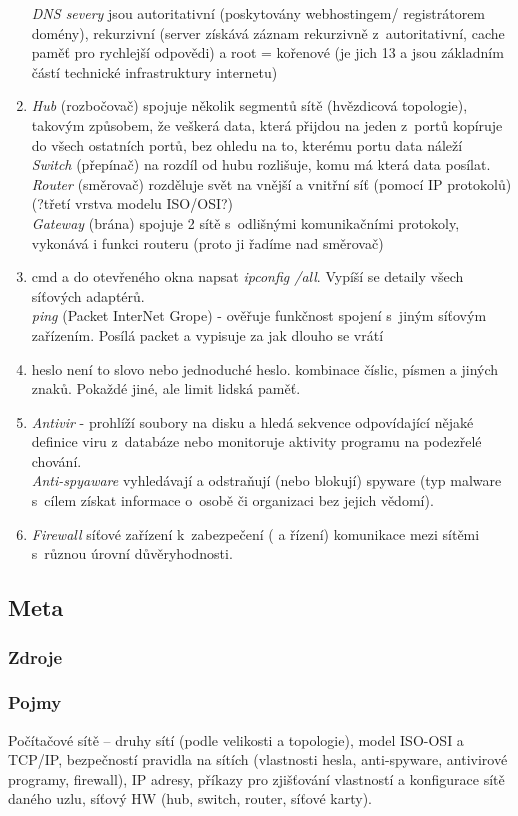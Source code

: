 \documentclass[12pt]{article}
\begin{document}
\begin{enumerate}
\emph{DNS severy} jsou autoritativní (poskytovány webhostingem/ registrátorem domény), rekurzivní (server získává záznam rekurzivně z~autoritativní, cache paměť pro rychlejší odpovědi) a root = kořenové (je jich 13 a jsou základním částí technické infrastruktury internetu)
\item \emph{Hub} (rozbočovač) spojuje několik segmentů sítě (hvězdicová topologie), takovým způsobem, že veškerá data, která přijdou na jeden z~portů kopíruje do všech ostatních portů, bez ohledu na to, kterému portu data náleží\\
\emph{Switch} (přepínač) na rozdíl od hubu rozlišuje, komu má která data posílat.\\
\emph{Router} (směrovač) rozděluje svět na vnější a vnitřní síť (pomocí IP protokolů) (?třetí vrstva modelu ISO/OSI?)\\
\emph{Gateway} (brána) spojuje 2 sítě s~odlišnými komunikačními protokoly, vykonává i funkci routeru (proto ji řadíme nad směrovač)
\item cmd a do otevřeného okna napsat \emph{ipconfig /all}. Vypíší se detaily všech síťových adaptérů.\\
\emph{ping} (Packet InterNet Grope) - ověřuje funkčnost spojení s~jiným síťovým zařízením. Posílá packet a vypisuje za jak dlouho se vrátí
\item heslo není to slovo nebo jednoduché heslo. kombinace číslic, písmen a jiných znaků. Pokaždé jiné, ale limit lidská paměť.
\item \emph{Antivir} - prohlíží soubory na disku a hledá sekvence odpovídající nějaké definice viru z~databáze nebo monitoruje aktivity programu na podezřelé chování.\\
\emph{Anti-spyaware} vyhledávají a odstraňují (nebo blokují) spyware (typ malware s~cílem získat informace o~osobě či organizaci bez jejich vědomí).\\
\item \emph{Firewall} síťové zařízení k~zabezpečení ( a řízení) komunikace mezi sítěmi s~různou úrovní důvěryhodnosti.
\end{enumerate}	
\subsection{Meta}
\subsubsection{Zdroje}
\subsubsection{Pojmy}
Počítačové sítě – druhy sítí (podle velikosti a topologie), model ISO-OSI a TCP/IP, bezpečností pravidla na sítích (vlastnosti hesla, anti-spyware, antivirové programy, firewall), IP adresy, příkazy pro zjišťování vlastností a konfigurace sítě daného uzlu, síťový HW (hub, switch, router, síťové karty).
\end{document}
